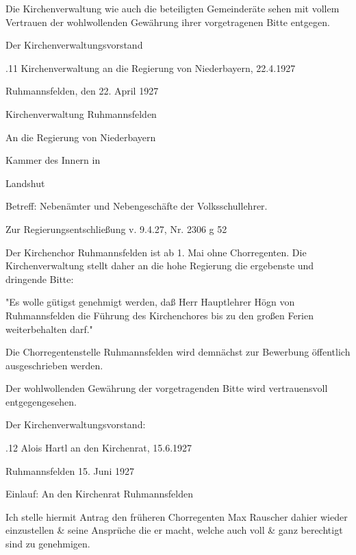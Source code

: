 Die Kirchenverwaltung wie auch die beteiligten Gemeinderäte sehen mit vollem
Vertrauen der wohlwollenden Gewährung ihrer vorgetragenen Bitte entgegen.



Der Kirchenverwaltungsvorstand

.11 Kirchenverwaltung an die Regierung von Niederbayern, 22.4.1927

Ruhmannsfelden, den 22. April 1927

Kirchenverwaltung Ruhmannsfelden



An die Regierung von Niederbayern

Kammer des Innern in

Landshut



Betreff: Nebenämter und Nebengeschäfte der Volksschullehrer.



Zur Regierungsentschließung v. 9.4.27, Nr. 2306 g 52



Der Kirchenchor Ruhmannsfelden ist ab 1. Mai ohne Chorregenten. Die
Kirchenverwaltung stellt daher an die hohe Regierung die ergebenste und
dringende Bitte:

"Es wolle gütigst genehmigt werden, daß Herr Hauptlehrer Högn von Ruhmannsfelden
die Führung des Kirchenchores bis zu den großen Ferien weiterbehalten darf."



Die Chorregentenstelle Ruhmannsfelden wird demnächst zur Bewerbung öffentlich
ausgeschrieben werden.

Der wohlwollenden Gewährung der vorgetragenden Bitte wird vertrauensvoll
entgegengesehen.



Der Kirchenverwaltungsvorstand:

.12 Alois Hartl an den Kirchenrat, 15.6.1927

Ruhmannsfelden 15. Juni 1927



Einlauf: An den Kirchenrat Ruhmannsfelden



Ich stelle hiermit Antrag den früheren Chorregenten Max Rauscher dahier wieder
einzustellen & seine Ansprüche die er macht, welche auch voll & ganz berechtigt
sind zu genehmigen.



